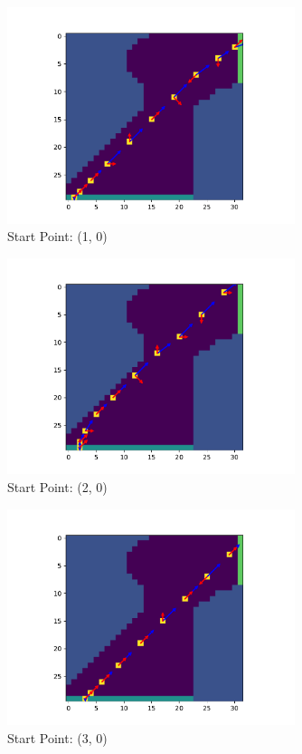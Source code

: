 \documentclass{article}
\begin{document}
\begin{figure}[H]
	\centering
	\includegraphics[width=0.75\textwidth]{../figure/fig_1}
	\caption{Start Point: (1, 0)}
	\label{fig:fig_1}
\end{figure}

\begin{figure}[H]
	\centering
	\includegraphics[width=0.75\textwidth]{../figure/fig_2}
	\caption{Start Point: (2, 0)}
	\label{fig:fig_2}
\end{figure}

\begin{figure}[H]
	\centering
	\includegraphics[width=0.75\textwidth]{../figure/fig_3}
	\caption{Start Point: (3, 0)}
	\label{fig:fig_3}
\end{figure}
\end{document}
